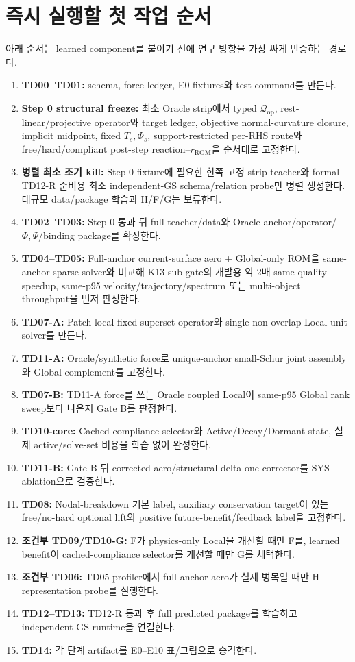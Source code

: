 \documentclass[10pt,a4paper]{article}
\begin{document}
\section{즉시 실행할 첫 작업 순서}

아래 순서는 learned component를 붙이기 전에 연구 방향을 가장 싸게 반증하는 경로다.

\begin{enumerate}
  \item \textbf{TD00--TD01:} schema, force ledger, E0 fixtures와 test command를 만든다.
  \item \textbf{Step 0 structural freeze:} 최소 Oracle strip에서 typed \(\mathcal Q_{\mathrm{op}}\),
  rest-linear/projective operator와 target ledger, objective normal-curvature closure,
  implicit midpoint, fixed \(T_s,\Phi_s\), support-restricted per-RHS route와
  free/hard/compliant post-step reaction--\(r_{\mathrm{ROM}}\)을 순서대로 고정한다.
  \item \textbf{병렬 최소 조기 kill:} Step 0 fixture에 필요한 한쪽 고정 strip teacher와
  formal TD12-R 준비용 최소 independent-GS schema/relation probe만 병렬 생성한다.
  대규모 data/package 학습과 H/F/G는 보류한다.
  \item \textbf{TD02--TD03:} Step 0 통과 뒤 full teacher/data와
  Oracle anchor/operator/\(\Phi,\Psi\)/binding package를 확장한다.
  \item \textbf{TD04--TD05:} Full-anchor current-surface aero + Global-only ROM을
  same-anchor sparse solver와 비교해 K13 sub-gate의 개발용 약 2배 same-quality speedup,
  same-p95 velocity/trajectory/spectrum 또는 multi-object throughput을 먼저 판정한다.
  \item \textbf{TD07-A:} Patch-local fixed-superset operator와 single non-overlap Local unit solver를 만든다.
  \item \textbf{TD11-A:} Oracle/synthetic force로 unique-anchor small-Schur joint assembly와 Global complement를 고정한다.
  \item \textbf{TD07-B:} TD11-A force를 쓰는 Oracle coupled Local이 same-p95 Global rank sweep보다 나은지 Gate B를 판정한다.
  \item \textbf{TD10-core:} Cached-compliance selector와 Active/Decay/Dormant state, 실제 active/solve-set 비용을 학습 없이 완성한다.
  \item \textbf{TD11-B:} Gate B 뒤 corrected-aero/structural-delta one-corrector를 SYS ablation으로 검증한다.
  \item \textbf{TD08:} Nodal-breakdown 기본 label, auxiliary conservation target이 있는
  free/no-hard optional lift와 positive future-benefit/feedback label을 고정한다.
  \item \textbf{조건부 TD09/TD10-G:} F가 physics-only Local을 개선할 때만 F를, learned benefit이 cached-compliance selector를 개선할 때만 G를 채택한다.
  \item \textbf{조건부 TD06:} TD05 profiler에서 full-anchor aero가 실제 병목일 때만 H representation probe를 실행한다.
  \item \textbf{TD12--TD13:} TD12-R 통과 후 full predicted package를 학습하고 independent GS runtime을 연결한다.
  \item \textbf{TD14:} 각 단계 artifact를 E0--E10 표/그림으로 승격한다.
\end{enumerate}
\end{document}
